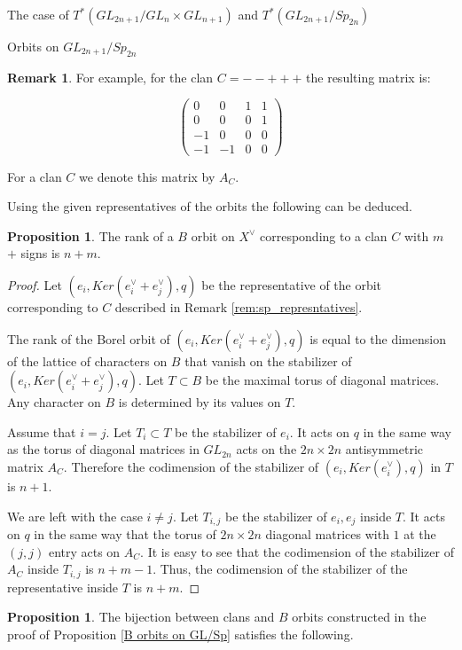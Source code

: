 \documentclass[12pt]{article}
\theoremstyle{plain}
\theoremstyle{definition}
\newtheorem{prop}[theorem]{Proposition}
\newtheorem{Remark}[theorem]{Remark}
\begin{document}
\begin{subsection}{The case of $T^*(GL_{2n+1}/GL_n\times GL_{n+1})$ and $T^*(GL_{2n+1}/Sp_{2n})$}
\begin{subsubsection}{Orbits on $GL_{2n+1}/Sp_{2n}$}
\begin{Remark}
        For example, for the clan $C=--+++$ the resulting matrix is:

        $$\begin{pmatrix}
            0& 0 & 1 &  1 \\
            0 & 0 & 0  & 1 \\
            -1 & 0 &  0 & 0 \\
            -1 & -1 & 0 & 0
        \end{pmatrix}$$

        For a clan $C$ we denote this matrix by $A_{C}$.
    \end{Remark}

Using the given representatives of the orbits the following can be deduced.

\begin{prop}\label{rank GL/Sp}
    The rank of a $B$ orbit on $X^\vee$ corresponding to a clan $C$ with $m$ $+$ signs is $n+m$.
\end{prop}

\begin{proof}
         Let $(e_i,Ker(e^\vee_i+e^\vee_j),q)$ be the representative of the orbit corresponding to $C$ described in Remark \ref{rem:sp_represntatives}. 

        The rank of the Borel orbit of $(e_i,Ker(e^\vee_i+e^\vee_j),q)$ is equal to the dimension of the lattice of characters on $B$ that vanish on the stabilizer of $(e_i,Ker(e^\vee_i+e^\vee_j),q)$. Let $T\subset B$ be the maximal torus of diagonal matrices. Any character on $B$ is determined by its values on $T$. 

         Assume that $i=j$. Let $T_i\subset T$ be the stabilizer of $e_i$. It acts on $q$ in the same way as the torus of diagonal matrices in $GL_{2n}$ acts on the $2n\times 2n$ antisymmetric matrix $A_C$. Therefore the codimension of the stabilizer of $(e_i,Ker(e^\vee_i),q)$ in $T$ is $n+1$. 
         
         We are left with the case $i\neq j$. Let $T_{i,j}$ be the stabilizer of $e_i,e_j$ inside $T$. It acts on $q$ in the same way that the torus of $2n\times 2n$ diagonal matrices with $1$ at the $(j,j)$ entry acts on $A_C$. It is easy to see that the codimension of the stabilizer of $A_C$ inside $T_{i,j}$ is $n+m-1$. Thus, the codimension of the stabilizer of the representative inside $T$ is $n+m$.
\end{proof}

\begin{prop}\label{B orbits in Ps for GL/Sp}
    The bijection between clans and $B$ orbits constructed in the proof of Proposition \ref{B orbits on GL/Sp} satisfies the following.
    

\end{prop}
\end{subsubsection}
\end{subsection}
\end{document}
